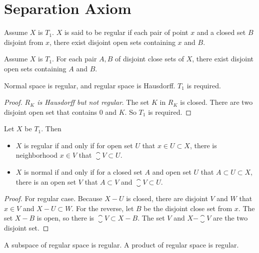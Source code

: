 
\section{Separation Axiom}

\begin{definition}
    Assume $X$ is $T_1$. $X$ is said to be regular if each pair of point $x$ and a closed set $B$ disjoint from $x$, there exist disjoint open sets containing $x$ and $B$.
\end{definition}

\begin{definition}
    Assume $X$ is $T_1$. For each pair $A,B$ of disjoint close sets of $X$, there exist disjoint open sets containing $A$ and $B$.
\end{definition}

\begin{theorem}
    Normal space is regular, and regular space is Hausdorff. $T_1$ is required.    
\end{theorem}
\begin{proof}
    \emph{$R_K$ is Hausdorff but not regular}. The set $K$ in $R_K$ is closed. There are two disjoint open set that contains $0$ and $K$. So $T_1$ is required.
\end{proof}


\begin{theorem}
    Let $X$ be $T_1$. Then
    \begin{itemize}
        \item $X$ is regular if and only if for open set $U$ that $x \in U \subset X$, there is neighborhood $x \in V$ that $\closure{V} \subset U$.
        \item $X$ is normal if and only if for a closed set $A$ and open set $U$ that $A \subset U \subset X$, there is an open set $V$ that $A \subset V$ and $\closure{V} \subset U$.
    \end{itemize}    
\end{theorem}
\begin{proof}
    For regular case. Because $X-U$ is closed, there are disjoint $V$ and $W$ that $x \in V$ and $X-U \subset W$. For the reverse, let $B$ be the disjoint close set from $x$. The set $X-B$ is open, so there is $\closure{V} \subset X - B$. The set $V$ and $X - \closure{V}$ are the two disjoint set.
\end{proof}

\begin{theorem}
    A subspace of regular space is regular. A product of regular space is regular.    
\end{theorem}



